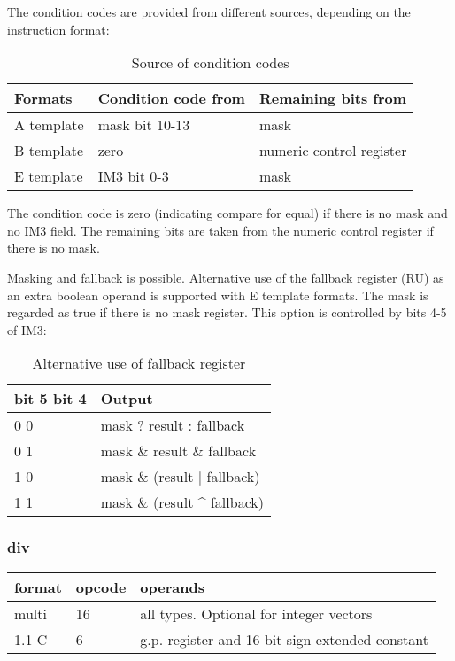 \documentclass[forwardcom.tex]{subfiles}
\begin{document}
\vspace{2mm}
The condition codes are provided from different sources, depending on the instruction format:

\begin{longtable} {|p{25mm}|p{50mm}|p{50mm}|}
\caption{Source of condition codes} 
\label{table:SourceOfConditionCodes} \\
\endfirsthead
\endhead
\hline
\bfseries Formats & \bfseries Condition code from & \bfseries Remaining bits from \\
\hline
A template & mask bit 10-13 & mask \\
\hline
B template & zero & numeric control register \\
\hline
E template & IM3 bit 0-3 & mask \\
\hline
\end{longtable}

The condition code is zero (indicating compare for equal) if there is no mask and no IM3 field. The remaining bits are taken from the numeric control register if there is no mask.

\vspace{2mm}
Masking and fallback is possible. Alternative use of the fallback register (RU) as an extra boolean operand is supported with E template formats. The mask is regarded as true if there is no mask register.
This option is controlled by bits 4-5 of IM3:

\begin{longtable} {|p{25mm}|p{80mm}|}
\caption{Alternative use of fallback register} 
\label{table:AlternativeFallbackForCompare} \\
\endfirsthead
\endhead
\hline
\bfseries bit 5 bit 4 & \bfseries Output \\
\hline
\hspace{5mm} 0 0 & mask ? result : fallback \\
\hline
\hspace{5mm} 0 1 & mask \& result \& fallback \\
\hline
\hspace{5mm} 1 0 & mask \& (result $|$ fallback) \\
\hline
\hspace{5mm} 1 1 & mask \& (result \^{} fallback) \\
\hline
\end{longtable}
\vspace{2mm}

\subsubsection{div}
\label{table:divInstruction}
\begin{tabular}{|p{12mm}|p{12mm}|p{110mm}|}
\hline
\bfseries format & \bfseries opcode & \bfseries operands \\ \hline
multi & 16 & all types. Optional for integer vectors \\ \hline
1.1 C &  6 & g.p. register and 16-bit sign-extended constant \\ \hline
\end{tabular}
\vspace{2mm}
\end{document}
